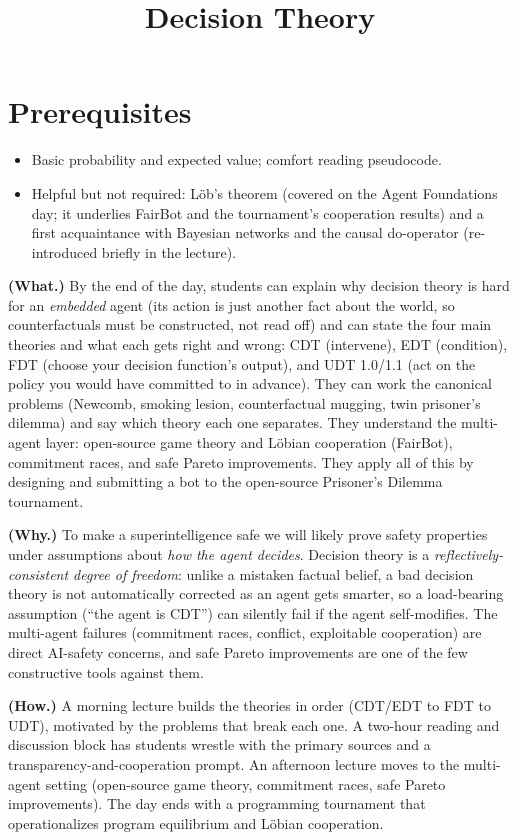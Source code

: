 \documentclass[11pt]{article}
\title{Decision Theory}
\author{
  \authorname{Daniel C}
  \and
  \authorname{Satya Benson}
}
\begin{document}
\maketitle

\section{Prerequisites}
\begin{itemize}
\item
  Basic probability and expected value; comfort reading pseudocode.
\item
  Helpful but not required: Löb's theorem (covered on the Agent Foundations day; it underlies FairBot and the tournament's cooperation results) and a first acquaintance with Bayesian networks and the causal do-operator (re-introduced briefly in the lecture).
\end{itemize}

\begin{learningoutcomes}
\textbf{(What.)} By the end of the day, students can explain why decision theory is hard for an \emph{embedded} agent (its action is just another fact about the world, so counterfactuals must be constructed, not read off) and can state the four main theories and what each gets right and wrong: CDT (intervene), EDT (condition), FDT (choose your decision function's output), and UDT 1.0/1.1 (act on the policy you would have committed to in advance). They can work the canonical problems (Newcomb, smoking lesion, counterfactual mugging, twin prisoner's dilemma) and say which theory each one separates. They understand the multi-agent layer: open-source game theory and Löbian cooperation (FairBot), commitment races, and safe Pareto improvements. They apply all of this by designing and submitting a bot to the open-source Prisoner's Dilemma tournament.

\textbf{(Why.)} To make a superintelligence safe we will likely prove safety properties under assumptions about \emph{how the agent decides}. Decision theory is a \emph{reflectively-consistent degree of freedom}: unlike a mistaken factual belief, a bad decision theory is not automatically corrected as an agent gets smarter, so a load-bearing assumption (``the agent is CDT'') can silently fail if the agent self-modifies. The multi-agent failures (commitment races, conflict, exploitable cooperation) are direct AI-safety concerns, and safe Pareto improvements are one of the few constructive tools against them.

\textbf{(How.)} A morning lecture builds the theories in order (CDT/EDT to FDT to UDT), motivated by the problems that break each one. A two-hour reading and discussion block has students wrestle with the primary sources and a transparency-and-cooperation prompt. An afternoon lecture moves to the multi-agent setting (open-source game theory, commitment races, safe Pareto improvements). The day ends with a programming tournament that operationalizes program equilibrium and Löbian cooperation.
\end{learningoutcomes}
\end{document}
